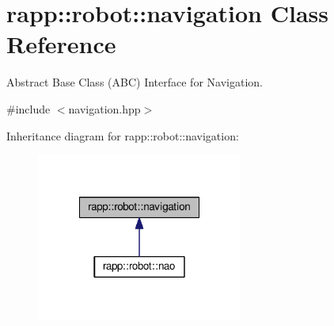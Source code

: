 \hypertarget{classrapp_1_1robot_1_1navigation}{\section{rapp\-:\-:robot\-:\-:navigation Class Reference}
\label{classrapp_1_1robot_1_1navigation}
}


Abstract Base Class (A\-B\-C) Interface for Navigation.  




{\ttfamily \#include $<$navigation.\-hpp$>$}



Inheritance diagram for rapp\-:\-:robot\-:\-:navigation\-:
\nopagebreak
\begin{figure}[H]
\begin{center}
\leavevmode
\includegraphics[width=192pt]{classrapp_1_1robot_1_1navigation__inherit__graph}
\end{center}
\end{figure}
